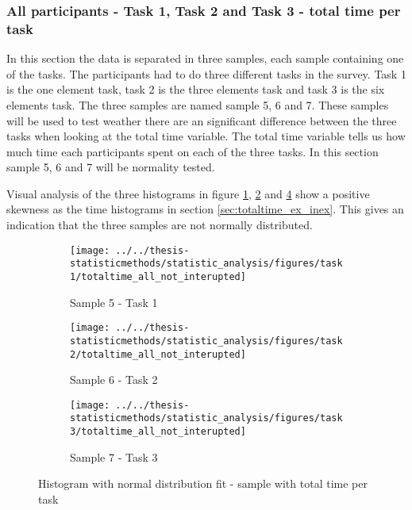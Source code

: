 \subsubsection[Sample 5, 6 and 7]{All participants - Task 1, Task 2 and Task 3 - total time per task}\label{sec:task123_time}

In this section the data is separated in three samples, each sample containing one of the tasks. The participants had to do three different tasks in the survey. Task 1 is the one element task, task 2 is the three elements task and task 3 is the six elements task. The three samples are named sample 5, 6 and 7. These samples will be used to test weather there are an significant difference between the three tasks when looking at the total time variable. The total time variable tells us how much time each participants spent on each of the three tasks. In this section sample 5, 6 and 7 will be normality tested. 
 
 Visual analysis of the three histograms in figure \ref{fig:totaltimeallnotinterupted_task1}, \ref{fig:totaltimeallnotinterupted_task2} and \ref{fig:totaltimeallnotinterupted_task3} show a positive skewness as the time histograms in section \ref{sec:totaltime_ex_inex}. This gives an indication that the three samples are not normally distributed. 

\begin{figure}[h!]
	\centering
	\begin{subfigure}[b]{0.3\textwidth}
		\centering
		\texttt{[image: ../../thesis-statisticmethods/statistic\_analysis/figures/task1/totaltime\_all\_not\_interupted]}
		\caption{Sample 5 - Task 1}
		\label{fig:totaltimeallnotinterupted_task1}
	\end{subfigure}
	\begin{subfigure}[b]{0.3\textwidth}
		\centering
		\texttt{[image: ../../thesis-statisticmethods/statistic\_analysis/figures/task2/totaltime\_all\_not\_interupted]}
		\caption{Sample 6 - Task 2}
		\label{fig:totaltimeallnotinterupted_task2}
	\end{subfigure}
	\begin{subfigure}[b]{0.3\textwidth}
		\centering
		\texttt{[image: ../../thesis-statisticmethods/statistic\_analysis/figures/task3/totaltime\_all\_not\_interupted]}
		\caption{Sample 7 - Task 3}
		\label{fig:totaltimeallnotinterupted_task3}
	\end{subfigure}
	\caption{Histogram with normal distribution fit - sample with total time per task}
\end{figure}

